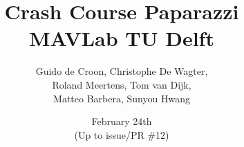 \documentclass{report}
\begin{document}
\author{Guido de Croon, Christophe De Wagter, \\Roland Meertens, Tom van Dijk, \\Matteo Barbera, Sunyou Hwang}
\title{\bf Crash Course Paparazzi \the\year\\MAVLab TU Delft}
\date{February 24th \the\year\\(Up to issue/PR \#12)}
\maketitle

\tableofcontents

\setlength{\parindent}{0em}





	
\end{document}
